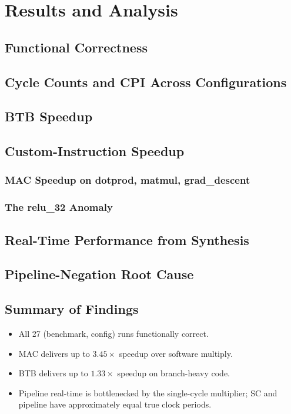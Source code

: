 \chapter{Results and Analysis}
\label{ch:results}

\section{Functional Correctness}

\section{Cycle Counts and CPI Across Configurations}

\section{BTB Speedup}

\section{Custom-Instruction Speedup}
\subsection{MAC Speedup on dotprod, matmul, grad\_descent}
\subsection{The relu\_32 Anomaly}

\section{Real-Time Performance from Synthesis}

\section{Pipeline-Negation Root Cause}

\section{Summary of Findings}
\begin{itemize}
  \item All 27 (benchmark, config) runs functionally correct.
  \item MAC delivers up to $3.45\times$ speedup over software multiply.
  \item BTB delivers up to $1.33\times$ speedup on branch-heavy code.
  \item Pipeline real-time is bottlenecked by the single-cycle multiplier;
        SC and pipeline have approximately equal true clock periods.
\end{itemize}
